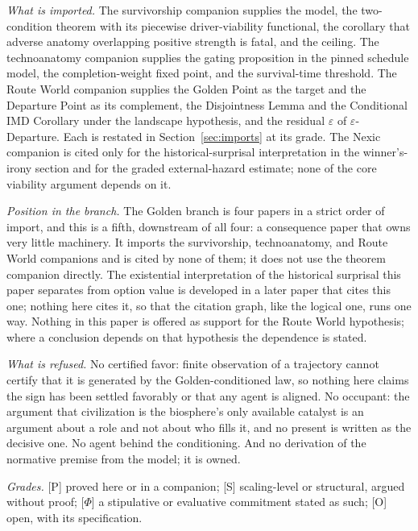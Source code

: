 \emph{What is imported.} The survivorship companion \cite{GoldenSurvivorship}
supplies the model, the two-condition theorem with its piecewise
driver-viability functional, the corollary that adverse anatomy
overlapping positive strength is fatal, and the ceiling. The
technoanatomy companion \cite{GoldenTechnoanatomy} supplies the gating proposition
in the pinned schedule model, the completion-weight fixed point, and the
survival-time threshold. The Route World companion \cite{GoldenRouteWorld}
supplies the Golden Point as the target and the Departure Point as its
complement, the Disjointness Lemma and the Conditional IMD Corollary
under the landscape hypothesis, and the residual $\varepsilon$ of
$\varepsilon$-Departure. Each is restated in Section~\ref{sec:imports}
at its grade. The Nexic companion \cite{Nexus} is cited only for the
historical-surprisal interpretation in the winner's-irony section and
for the graded external-hazard estimate; none of the core viability
argument depends on it.

\emph{Position in the branch.} The Golden branch is four papers in a
strict order of import, and this is a fifth, downstream of all four: a
consequence paper that owns very little machinery. It imports the
survivorship, technoanatomy, and Route World companions and is cited
by none of them; it does not use the theorem companion directly. The
existential interpretation of the historical surprisal this paper
separates from option value is developed in a later paper that cites
this one; nothing here cites it, so that the citation graph, like the
logical one, runs one way. Nothing in this paper is offered as support for the Route World
hypothesis; where a conclusion depends on that hypothesis the
dependence is stated.

\emph{What is refused.} No certified favor: finite observation of a
trajectory cannot certify that it is generated by the Golden-conditioned
law, so nothing here claims the sign has been settled favorably or that
any agent is aligned. No occupant: the argument that civilization is
the biosphere's only available catalyst is an argument about a role and
not about who fills it, and no present is written as the decisive one.
No agent behind the conditioning. And no derivation of the normative
premise from the model; it is owned.

\emph{Grades.} [P] proved here or in a companion; [S] scaling-level or
structural, argued without proof; [$\Phi$] a stipulative or evaluative
commitment stated as such; [O] open, with its specification.

